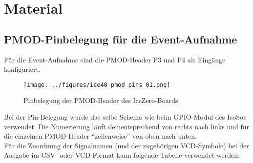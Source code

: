 \chapter{Material}
\label{ch:Material}
\enlargethispage{120cm}
\section{PMOD-Pinbelegung für die Event-Aufnahme}
\label{sec:pmod_pins}
Für die Event-Aufnahme sind die PMOD-Header P3 und P4 als Eingänge konfiguriert.

\begin{figure}[h]
	\centering
	\captionsetup{justification=centering,margin=2cm}
		\texttt{[image: ../figures/ice40\_pmod\_pins\_01.png]}
		\caption[Pinbelegung der PMOD-Header des IceZero-Boards]{Pinbelegung der PMOD-Header des IceZero-Boards}
	\label{fig:ice40_pmod_pins}
\end{figure}

Bei der Pin-Belegung wurde das selbe Schema wie beim GPIO-Modul des IcoSoc verwendet. Die Numerierung läuft dementsprechend von rechts nach links und für die einzelnen PMOD-Header ``zeilenweise'' von oben nach unten.\\
Für die Zuordnung der Signalnamen (und der zugehörigen VCD-Symbole) bei der Ausgabe im CSV- oder VCD-Format kann folgende Tabelle verwendet werden:

